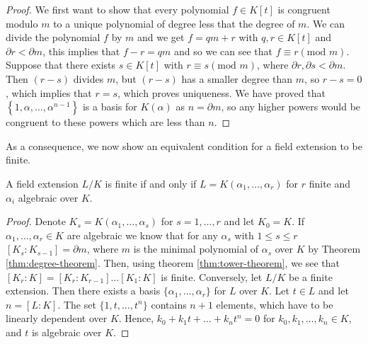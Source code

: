 \begin{proof}
    We first want to show that every polynomial \(f \in K[t]\) is congruent modulo \(m\) to a unique polynomial of degree less that the degree of \(m\). We can divide the polynomial \(f\) by \(m\) and we get \(f = qm + r\) with \(q,r \in K[t]\) and \(\partial r < \partial m\), this implies that \(f - r =qm\) and so we can see that \(f \equiv r (\text{mod } m)\). Suppose that there exists \(s \in K[t]\) with \(r \equiv s(\text{mod }m)\), where \(\partial r, \partial s < \partial m\). Then \((r - s)\) divides \(m\), but \((r-s)\) has a smaller degree than \(m\), so \(r-s=0\), which implies that \(r=s\), which proves uniqueness. We have proved that $\left\{1, \alpha, \ldots, \alpha^{n-1}\right\}$ is a basis for \(K(\alpha)\) as \(n = \partial m\), so any higher powers would be congruent to these powers which are less than \(n\).
    \end{proof}

%
As a consequence, we now show an equivalent condition for a field extension to be finite. 

\begin{theorem} \label{thm:finite-equi-def}
    A field extension $L/K$ is finite if and only if $L = K(\alpha_1, \dots, \alpha_r)$ for $r$ finite and $\alpha_i$ algebraic over $K$. 
\end{theorem}

\begin{proof}
    Denote $K_s = K(\alpha_1, \dots, \alpha_s)$ for $s = 1, \dots, r$ and let $K_0 = K$. If \(\alpha_1, \dots , \alpha_r \in K\) are algebraic we know that for any \(\alpha_s\) with \(1 \leq s \leq r\) \( [K_s: K_{s-1}] = \partial m\), where \(m\) is the minimal polynomial of \(\alpha_s\) over \(K\) by Theorem \ref{thm:degree-theorem}. Then, using theorem \ref{thm:tower-theorem}, we see that \([K_r : K] = [K_r:K_{r-1}]\dots[K_1:K]\) is finite. Conversely, let \(L/K\) be a finite extension. Then there exists a basis \(\{\alpha_1, \dots, \alpha_r\}\) for \(L\) over \(K\). Let \(t \in L\)  and let \(n = [L:K]\). The set \(\{1,t,\dots,t^n\}\) contains \(n+1\) elements, which have to be linearly dependent over \(K\). Hence, \(k_0 + k_1 t + \dots + k_n t^n = 0\) for \(k_0, k_1, \dots, k_n \in K\), and \(t\) is algebraic over \(K\).
\end{proof}



